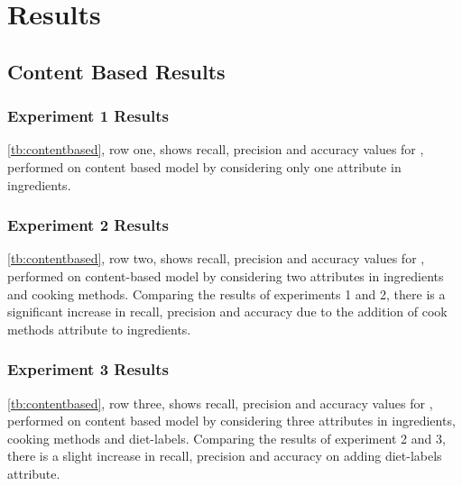 \chapter{Results}
\section{Content Based Results}
\subsection{Experiment 1 Results}
\autoref{tb:contentbased}, row one, shows recall, precision and accuracy values for , performed on content based model by considering only one attribute in ingredients.

\subsection{Experiment 2 Results}
\autoref{tb:contentbased}, row two, shows recall, precision and accuracy values for , performed on content-based model by considering two attributes in ingredients and cooking methods. Comparing the results of experiments 1 and 2, there is a significant increase in recall, precision and accuracy due to the addition of cook methods attribute to ingredients.

\subsection{Experiment 3 Results}
\autoref{tb:contentbased}, row three, shows recall, precision and accuracy values for , performed on content based model by considering three attributes in ingredients, cooking methods and diet-labels. Comparing the results of experiment 2 and 3, there is a slight increase in recall, precision and accuracy on adding diet-labels attribute.

